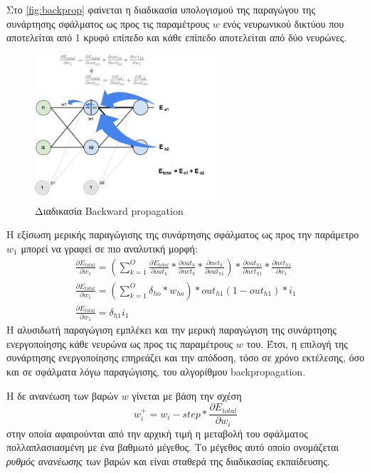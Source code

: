 Στο \autoref{fig:backprop} φαίνεται η διαδικασία υπολογισμού της παραγώγου της συνάρτησης
σφάλματος ως προς τις παραμέτρους $w$
ενός νευρωνικού δικτύου που αποτελείται από 1 κρυφό επίπεδο και κάθε επίπεδο
αποτελείται από δύο νευρώνες.

\begin{figure}[!ht]
  \centering
  \hspace*{2cm}
  \includegraphics[width=0.6\textwidth]{./images/chapter3/backprop.png}
  \caption[Διαδικασία Backward propagation]{Διαδικασία Backward propagation}
  \label{fig:backprop}
\end{figure}

Η εξίσωση μερικής παραγώγισης της συνάρτησης σφάλματος ως προς την παράμετρο
$w_{1}$ μπορεί να γραφεί σε πιο αναλυτική μορφή:
\begin{gather*}
  \frac{\partial E_{total}}{\partial w_{1}} = (\sum_{k=1}^{O}\frac{\partial E_{total}}{\partial out_{k}}*\frac{\partial out_{k}}{\partial net_{k}}*\frac{\partial net_{k}}{\partial out_{h1}})*\frac{\partial out_{h1}}{\partial net_{h1}}*\frac{\partial net_{h1}}{\partial w_{1}} \\
  \frac{\partial E_{total}}{\partial w_{1}} = (\sum_{k=1}^{O}\delta_{ho}*w_{ho}) * out_{h1}(1-out_{h1}) * i_{1} \\
  \frac{\partial E_{total}}{\partial w_{1}} = \delta_{h1}i_{1}
\end{gather*}
Η αλυσιδωτή παραγώγιση εμπλέκει και την μερική παραγώγιση της
συνάρτησης ενεργοποίησης κάθε νευρώνα ως προς τις παραμέτρους $w$ του.
Έτσι, η επιλογή της
συνάρτησης ενεργοποίησης επηρεάζει και την απόδοση, τόσο σε χρόνο εκτέλεσης,
όσο και σε σφάλματα λόγω παραγώγισης, του αλγορίθμου backpropagation.

Η δε ανανέωση των βαρών $w$ γίνεται με βάση την σχέση
\begin{equation*}
  w_{i}^{+} = w_{i} - step * \frac{\partial E_{total}}{\partial w_{i}}
\end{equation*}
στην οποία αφαιρούνται από την αρχική τιμή η μεταβολή του σφάλματος πολλαπλασιασμένη
με ένα βαθμωτό μέγεθος. Το μέγεθος αυτό οποίο ονομάζεται \emph{ρυθμός ανανέωσης}
των βαρών και είναι σταθερά της διαδικασίας εκπαίδευσης.

